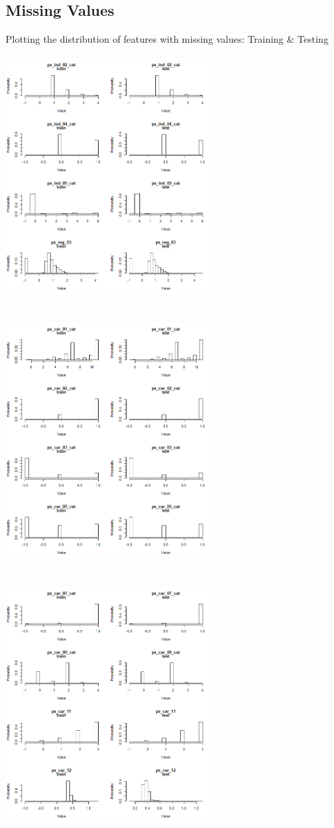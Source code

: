 \documentclass[fleqn,10pt]{SelfArx} %
\begin{document}
\subsection{Missing Values}
Plotting the distribution of features with missing values: Training \& Testing\\
\includegraphics[width=8cm, height=10cm]{comp_1} \\
\includegraphics[width=8cm, height=10cm]{comp_2} \\
\includegraphics[width=8cm, height=10cm]{comp_3} \\
\end{document}
